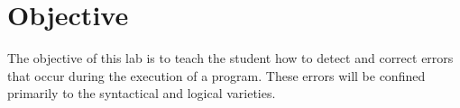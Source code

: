 \section{Objective}

The objective of this lab is to teach the student how to detect and correct errors that occur during the execution of a program. These errors will be confined primarily to the syntactical and logical varieties.